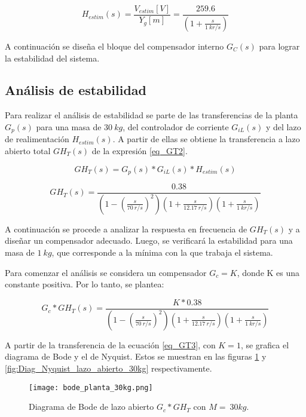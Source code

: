 \begin{equation*} 
	H_{estim}(s)=\frac{V_{estim}[V]}{Y_{g}[m]}=\frac{259.6}{(1+\frac{s}{1\:kr/s})}
\end{equation*}

A continuación se diseña el bloque del compensador interno $G_C(s)$ para lograr la estabilidad del sistema.

\subsection{Análisis de estabilidad}

Para realizar el análisis de estabilidad se parte de las transferencias de la planta $G_{p}(s)$ para una masa de $30\:kg$, del controlador de corriente $G_{iL}(s)$ y del lazo de realimentación $H_{estim}(s)$. A partir de ellas se obtiene la transferencia a lazo abierto total $GH_T(s)$ de la expresión \ref{eq_GT2}.

\begin{equation*}
	GH_T(s)=G_{p}(s)*G_{iL}(s)*H_{estim}(s) 
\end{equation*}

\begin{equation} \label{eq_GT2}
		GH_T(s)=\frac{0.38}{(1-(\frac{s}{70\:r/s})^2)(1+\frac{s}{12.17\:r/s })(1+\frac{s}{1\:kr/s}) }	
\end{equation}

\noindent A continuación se procede a analizar la respuesta en frecuencia de $GH_T(s)$ y a diseñar un compensador adecuado. Luego, se verificará la estabilidad para una masa de $1\:kg$, que corresponde a la mínima con la que trabaja el sistema.

Para comenzar el análisis se considera un compensador $G_c=K$, donde K es una constante positiva. Por lo tanto, se plantea:

\begin{equation} \label{eq_GT3}
	G_c*GH_T(s)=\frac{K*0.38}{(1-(\frac{s}{70\:r/s})^2)(1+\frac{s}{12.17\:r/s })(1+\frac{s}{1\:kr/s}) }	
\end{equation}

A partir de la transferencia de la ecuación  \ref{eq_GT3}, con $K=1$, se  grafica el diagrama de Bode y el de Nyquist. Estos se muestran en las figuras \ref{fig:Diag_Bode_lazo_abierto_30kg} y \ref{fig:Diag_Nyquist_lazo_abierto_30kg} respectivamente.

\begin{figure}[H]
	\centering
	\texttt{[image: bode\_planta\_30kg.png]}
	\caption{Diagrama de Bode de lazo abierto $G_c*GH_T$ con $M=\:30 kg$.}
	\label{fig:Diag_Bode_lazo_abierto_30kg}
\end{figure}

